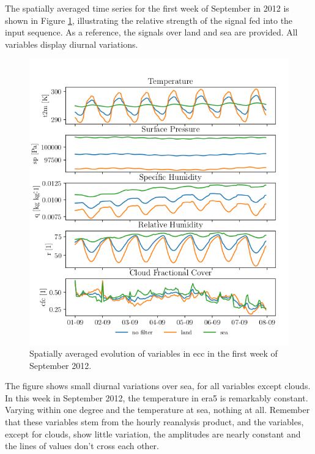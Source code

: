 The spatially averaged time series for the first week of September in 2012 is shown in Figure \ref{fig:first_week_sep_2012}, illustrating the relative strength of the signal fed into the input sequence. As a reference, the signals over land and sea are provided. All variables display diurnal variations. 
\begin{figure}[ht]
    \centering
    \includegraphics{python_figs/spatially_averaged_one_week_from_2012-09-01.png}
    \caption{Spatially averaged evolution of variables in \acrshort{ecc} in the first week of September 2012.}
    \label{fig:first_week_sep_2012}
\end{figure}
The figure shows small diurnal variations over sea, for all variables except clouds. In this week in September 2012, the temperature in \acrshort{era5} is remarkably constant. Varying within one degree and the temperature at sea, nothing at all. Remember that these variables stem from the hourly reanalysis product, and the variables, except for clouds, show little variation, the amplitudes are nearly constant and the lines of values don't cross each other. 

